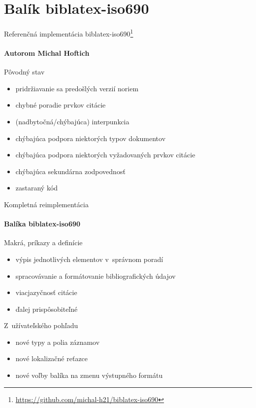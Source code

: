 \documentclass{beamer}
\begin{document}
\section{Balík biblatex-iso690}

\begin{frame}{Referenčná implementácia \textsf{biblatex-iso690}\footnote[frame]{\url{https://github.com/michal-h21/biblatex-iso690}}}
\framesubtitle{Autorom Michal Hoftich}
Pôvodný stav
\begin{itemize}
\item pridržiavanie sa predošlých verzií noriem %
\item chybné poradie prvkov citácie %
\item (nadbytočná/chýbajúca) interpunkcia %
\item chýbajúca podpora niektorých typov dokumentov %
\item chýbajúca podpora niektorých vyžadovaných prvkov citácie %
\item chýbajúca sekundárna zodpovednosť %
\item zastaraný kód %
\end{itemize}
\end{frame}

\begin{frame}{Kompletná reimplementácia}
\framesubtitle{Balíka \textsf{biblatex-iso690}}
Makrá, príkazy a definície
\begin{itemize}
\item výpis jednotlivých elementov v~správnom poradí
\item spracovávanie a formátovanie bibliografických údajov
\item viacjazyčnosť citácie
\item ďalej prispôsobiteľné
\end{itemize}

Z~užívateľského pohľadu
\begin{itemize}
\item nové typy a polia záznamov
\item nové lokalizačné reťazce
\item nové voľby balíka na zmenu výstupného formátu
\end{itemize}
\end{frame}
\end{document}
